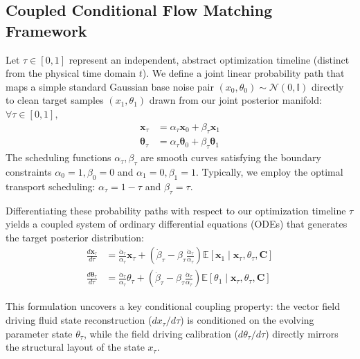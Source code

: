 \documentclass[10pt]{article}
\begin{document}
\subsection{Coupled Conditional Flow Matching Framework}
Let $\tau \in [0, 1]$ represent an independent, abstract optimization timeline (distinct from the physical time domain $t$). We define a joint linear probability path that maps a simple standard Gaussian base noise pair $(x_0, \theta_0) \sim \mathcal{N}(0, \mathbb{I})$ directly to clean target samples $(x_1, \theta_1)$ drawn from our joint posterior manifold: $\forall \tau \in [0, 1],$
\begin{align}
    \mathbf{x}_\tau &= \alpha_\tau \mathbf{x}_0 + \beta_\tau \mathbf{x}_1 \\
    \mathbf{\theta}_\tau &= \alpha_\tau \mathbf{\theta}_0 + \beta_\tau \mathbf{\theta}_1  \label{eq:interpolants}
\end{align}
The scheduling functions $\alpha_\tau, \beta_\tau$ are smooth curves satisfying the boundary constraints $\alpha_0 = 1, \beta_0 = 0$ and $\alpha_1 = 0, \beta_1 = 1$. Typically, we employ the optimal transport scheduling: $\alpha_\tau = 1 - \tau$ and $\beta_\tau = \tau$.

Differentiating these probability paths with respect to our optimization timeline $\tau$ yields a coupled system of ordinary differential equations (ODEs) that  generates the target posterior distribution: 
\begin{align}
    \frac{d\mathbf{x}_\tau}{d\tau} &= \frac{\dot{\alpha}_\tau}{\alpha_\tau} \mathbf{x}_\tau + \left( \dot{\beta}_\tau - \beta_\tau \frac{\dot{\alpha}_\tau}{\alpha_\tau} \right)
    \mathbb{E}[\mathbf{x}_1 \mid \mathbf{x}_\tau, \theta_\tau, \mathbf{C}] \label{eq:coupled_ode_x} \\
    \frac{d\mathbf{\theta}_\tau}{d\tau} &= \frac{\dot{\alpha}_\tau}{\alpha_\tau} \theta_\tau + \left( \dot{\beta}_\tau - \beta_\tau \frac{\dot{\alpha}_\tau}{\alpha_\tau} \right) \mathbb{E}[\theta_1 \mid \mathbf{x}_\tau, \theta_\tau, \mathbf{C}] \label{eq:coupled_ode_theta}
\end{align}


This formulation uncovers a key conditional coupling property: the vector field driving fluid state reconstruction ($dx_\tau/d\tau$) is conditioned on the evolving parameter state $\theta_\tau$, while the field driving calibration ($d\theta_\tau/d\tau$) directly mirrors the structural layout of the state $x_\tau$. 
\end{document}
